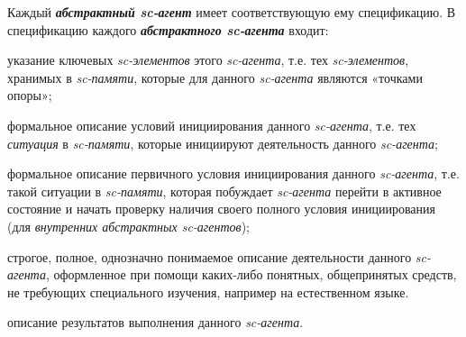 Каждый \textbf{\textit{абстрактный sc-агент}} имеет соответствующую ему спецификацию. В спецификацию каждого \textbf{\textit{абстрактного sc-агента}} входит:
\begin{textitemize}
	\item указание ключевых \textit{sc-элементов} этого \textit{sc-агента}, т.е. тех \textit{sc-элементов}, хранимых в \textit{sc-памяти}, которые для данного \textit{sc-агента} являются «точками опоры»;
	\item формальное описание условий инициирования данного \textit{sc-агента}, т.е. тех \textit{ситуация} в \textit{sc-памяти}, которые инициируют деятельность данного \textit{sc-агента};
	\item формальное описание первичного условия инициирования данного \textit{sc-агента}, т.е. такой ситуации в \textit{sc-памяти}, которая побуждает \textit{sc-агента} перейти в активное состояние и начать проверку наличия своего полного условия инициирования (для \textit{внутренних абстрактных sc-агентов});
	\item строгое, полное, однозначно понимаемое описание деятельности данного \textit{sc-агента}, оформленное при помощи каких-либо понятных, общепринятых средств, не требующих специального изучения, например на естественном языке.
	\item описание результатов выполнения данного \textit{sc-агента}.
\end{textitemize}

